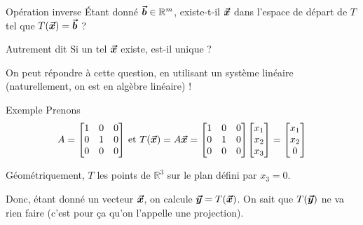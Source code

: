 \documentclass{article}
\begin{document}
\begin{parag}{Opération inverse}
    Étant donné $\bm{\protect\vec{b}} \in \mathbb{R}^{m}$, existe-t-il $\bm{\protect\vec{x}}$ dans l'espace de départ de $T$ tel que $T\left(\bvec{x}\right) = \bvec{b}$ ?

    Autrement dit  Si un tel $\bm{\protect\vec{x}}$ existe, est-il unique ?

    On peut répondre à cette question, en utilisant un système linéaire (naturellement, on est en algèbre linéaire) ! \smiley
\end{parag}

\begin{parag}{Exemple}
    Prenons
    \[A = \begin{bmatrix} 1 & 0 & 0 \\ 0 & 1 & 0 \\ 0 & 0 & 0 \end{bmatrix} \text{ et } T\left(\bvec{x}\right) = A \bvec{x} = \begin{bmatrix} 1 & 0 & 0 \\ 0 & 1 & 0 \\ 0 & 0 & 0 \end{bmatrix} \begin{bmatrix} x_1 \\ x_2 \\ x_3 \end{bmatrix}  = \begin{bmatrix} x_1 \\ x_2 \\ 0 \end{bmatrix} \]

    Géométriquement, $T$  les points de $\mathbb{R}^{3}$ sur le plan défini par $x_3 = 0$.


    Donc, étant donné un vecteur $\bm{\protect\vec{x}}$, on calcule $\bvec{y} = T\left(\bvec{x}\right)$. On sait que $T\left(\bvec{y}\right)$ ne va rien faire (c'est pour ça qu'on l'appelle une projection).
\end{parag}
\end{document}
